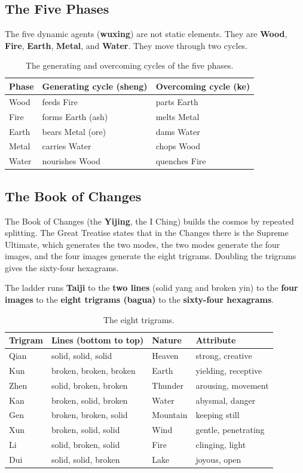 \subsection{The Five Phases}

The five dynamic agents (\textbf{wuxing}) are not static elements. They are \textbf{Wood}, \textbf{Fire}, \textbf{Earth}, \textbf{Metal}, and \textbf{Water}. They move through two cycles.

\begin{longtable}{L{4cm} L{4.5cm} L{4.5cm}}
\caption{The generating and overcoming cycles of the five phases.}\\
\toprule
\textbf{Phase} & \textbf{Generating cycle (sheng)} & \textbf{Overcoming cycle (ke)} \\
\midrule
Wood & feeds Fire & parts Earth \\
Fire & forms Earth (ash) & melts Metal \\
Earth & bears Metal (ore) & dams Water \\
Metal & carries Water & chops Wood \\
Water & nourishes Wood & quenches Fire \\
\bottomrule
\end{longtable}

\subsection{The Book of Changes}

The Book of Changes (the \textbf{Yijing}, the I Ching) builds the cosmos by repeated splitting. The Great Treatise states that in the Changes there is the Supreme Ultimate, which generates the two modes, the two modes generate the four images, and the four images generate the eight trigrams. Doubling the trigrams gives the sixty-four hexagrams.

The ladder runs \textbf{Taiji} to the \textbf{two lines} (solid yang and broken yin) to the \textbf{four images} to the \textbf{eight trigrams (bagua)} to the \textbf{sixty-four hexagrams}.

\begin{longtable}{L{2.5cm} L{4cm} L{2.5cm} L{4cm}}
\caption{The eight trigrams.}\\
\toprule
\textbf{Trigram} & \textbf{Lines (bottom to top)} & \textbf{Nature} & \textbf{Attribute} \\
\midrule
Qian & solid, solid, solid & Heaven & strong, creative \\
Kun & broken, broken, broken & Earth & yielding, receptive \\
Zhen & solid, broken, broken & Thunder & arousing, movement \\
Kan & broken, solid, broken & Water & abysmal, danger \\
Gen & broken, broken, solid & Mountain & keeping still \\
Xun & broken, solid, solid & Wind & gentle, penetrating \\
Li & solid, broken, solid & Fire & clinging, light \\
Dui & solid, solid, broken & Lake & joyous, open \\
\bottomrule
\end{longtable}

